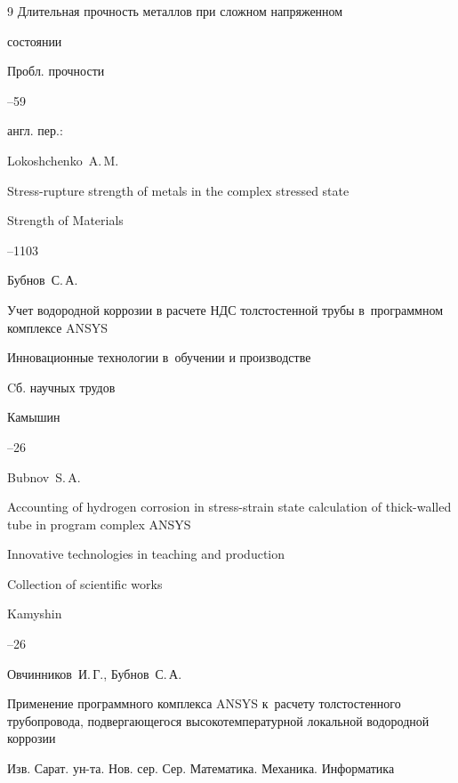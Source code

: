 \begin{thebibliography}{9}
\paper Длительная прочность металлов при сложном напряженном

состоянии

\jour Пробл. прочности



--59

\transl англ. пер.:~

\by Lokoshchenko~A.\,M.

\paper Stress-rupture strength of metals in the complex stressed state

\jour Strength of Materials



–1103




\by Бубнов~С.\,А. 

\paper Учет водородной коррозии в расчете НДС толстостенной трубы в~программном комплексе ANSYS 

\inbook Инновационные технологии в~обучении и производстве

\bookinfo Cб. научных трудов 

\publaddr Камышин


–26

\misctransl

\by Bubnov~S.\,A.

\paper Accounting of hydrogen corrosion in  stress-strain state calculation  of thick-walled tube in program complex ANSYS 

\inbook Innovative technologies in teaching and production

\bookinfo Collection of scientific works

\publaddr Kamyshin


–26






\by Овчинников~И.\,Г., Бубнов~С.\,А.

\paper Применение программного комплекса ANSYS к~расчету толстостенного трубопровода, подвергающегося высокотемпературной локальной водородной коррозии

\jour Изв. Сарат. ун-та. Нов. сер. Сер. Математика. Механика. Информатика


\end{thebibliography}
